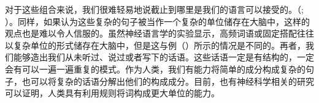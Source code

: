对于这些组合来说，我们很难轻易地说截止到哪里是我们的语言可以接受的。（\citealp[]{Harris57a}; \citealp[]{Chomsky57a}）。同样，如果认为这些复杂的句子被当作一个复杂的单位储存在大脑中，这样的观点也是难以令人信服的。虽然神经语言学的实验显示，高频词语或固定搭配往往以复杂单位的形式储存在大脑中，但是这与例（）所示的情况是不同的。再者，我们能够造出我们从未听过、说过或者写下的话语。这些话语一定是有结构的，一定会有可以一遍一遍重复的模式。作为人类，我们有能力将简单的成分构成复杂的句子，也可以将复杂的话语分解出他们的构成成分。目前，也有神经科学相关的研究可以证明，人类具有利用规则将词构成更大单位的能力。\citep[]{Pulvermueller2010a}


